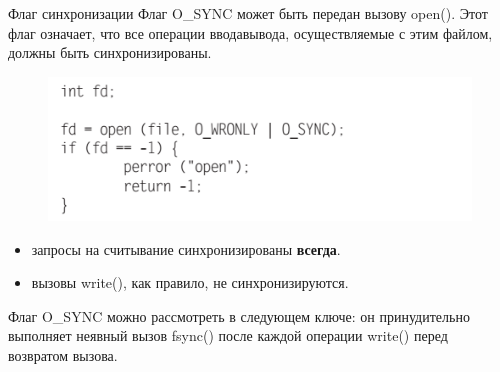 \documentclass{beamer}
\begin{document}
\begin{frame}{Флаг синхронизации}
Флаг O\_SYNC может быть передан вызову open(). Этот флаг означает, что все операции
ввода­вывода, осуществляемые с этим файлом, должны быть синхронизированы.
\begin{figure}[h]
\centering
\includegraphics[scale=0.6]{images/lec06-pic16.png}
\end{figure}
\begin{itemize}
\item запросы на считывание синхронизированы \textbf{всегда}. 
\item вызовы write(), как правило, не синхронизируются.
\end{itemize}
Флаг O\_SYNC можно рассмотреть в следующем ключе: он принудительно выполняет неявный вызов fsync() после каждой операции write() перед возвратом вызова. 
\end{frame}
\end{document}
